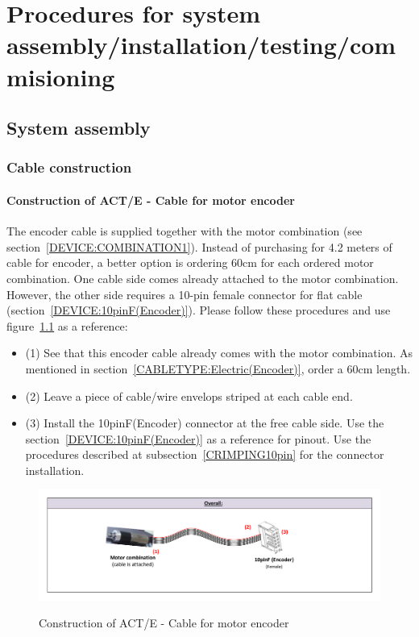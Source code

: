 

\chapter{Procedures for system assembly/installation/testing/commisioning} \label{CHAPTERASSEMBLY}

\section{System assembly}
\subsection{Cable construction}
\subsubsection{Construction of ACT/E - Cable for motor encoder} \label{CONSTRUCTION:ACTE}
The encoder cable is supplied together with the motor combination (see section~\ref{DEVICE:COMBINATION1}). Instead of purchasing for 4.2 meters of cable for encoder, a better option is ordering 60cm for each ordered motor combination. One cable side comes already attached to the motor combination. However, the other side requires a 10-pin female connector for flat cable (section~\ref{DEVICE:10pinF(Encoder)}). Please follow these procedures and use figure~\ref{FIG:ACTEconstruction} as a reference:
\begin{itemize}
  \item (1) See that this encoder cable already comes with the motor combination. As mentioned in section~\ref{CABLETYPE:Electric(Encoder)}, order a 60cm length.
  \item (2) Leave a piece of cable/wire envelops striped at each cable end.
  \item (3) Install the 10pinF(Encoder) connector at the free cable side. Use the section~\ref{DEVICE:10pinF(Encoder)} as a reference for pinout. Use the procedures described at subsection~\ref{CRIMPING10pin} for the connector installation.
\end{itemize}
\begin{figure}
  \centering
  \includegraphics[angle=90,width=1\columnwidth]{figs/body03/FIGACTEconstruction.pdf}\\
  \caption[Construction of ACT/E - Cable for motor encoder]{Construction of ACT/E - Cable for motor encoder}
  \label{FIG:ACTEconstruction}
\end{figure}
